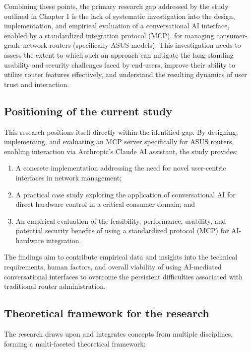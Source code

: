 Combining these points, the primary research gap addressed by the study outlined in Chapter 1 is the lack of systematic investigation into the design, implementation, and empirical evaluation of a conversational AI interface, enabled by a standardized integration protocol (MCP), for managing consumer-grade network routers (specifically ASUS models). This investigation needs to assess the extent to which such an approach can mitigate the long-standing usability and security challenges faced by end-users, improve their ability to utilize router features effectively, and understand the resulting dynamics of user trust and interaction.

\subsection{Positioning of the current study}
This research positions itself directly within the identified gap. By designing, implementing, and evaluating an MCP server specifically for ASUS routers, enabling interaction via Anthropic's Claude AI assistant, the study provides:

\begin{enumerate}
\item A concrete implementation addressing the need for novel user-centric interfaces in network management;
\item A practical case study exploring the application of conversational AI for direct hardware control in a critical consumer domain; and
\item An empirical evaluation of the feasibility, performance, usability, and potential security benefits of using a standardized protocol (MCP) for AI-hardware integration.
\end{enumerate}

The findings aim to contribute empirical data and insights into the technical requirements, human factors, and overall viability of using AI-mediated conversational interfaces to overcome the persistent difficulties associated with traditional router administration.

\subsection{Theoretical framework for the research}
The research draws upon and integrates concepts from multiple disciplines, forming a multi-faceted theoretical framework:

